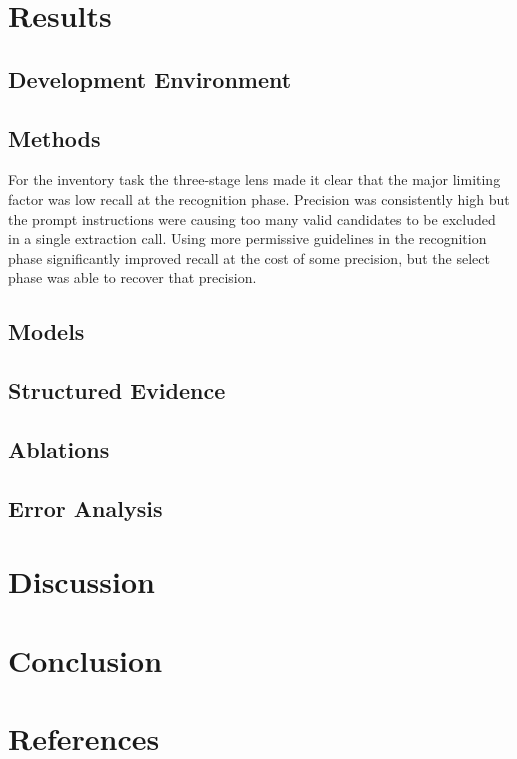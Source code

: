 \documentclass[conference]{IEEEtran}
\begin{document}
\section{Results}
\subsection{Development Environment}



\subsection{Methods}

For the inventory task the
three-stage lens made it clear that the major limiting factor
was low recall at the recognition phase. Precision was
consistently high but the prompt instructions were causing
too many valid candidates to be excluded in a single 
extraction call. Using more permissive guidelines in
the recognition phase significantly improved recall at
the cost of some precision, but the select phase was 
able to recover that precision. 

\subsection{Models}
\subsection{Structured Evidence}
\subsection{Ablations}
\subsection{Error Analysis}

\section{Discussion}

\section{Conclusion}


\section*{References}
\end{document}
